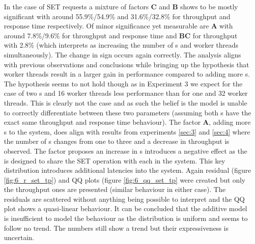     In the case of SET requests a mixture of factors \textbf{C} and \textbf{B} shows to be mostly significant with
    around 55.9\%/54.9\% and 31.6\%/32.8\% for throughput and response time respectively. Of minor significance yet
    measurable are \textbf{A} with around 7.8\%/9.6\% for throughput and response time and \textbf{BC} for
    throughput with 2.8\% (which interprets as increasing the number of \mw{}s and worker threads simultaneously).
    The change in sign occurs again correctly. The analysis aligns with previous observations and conclusions while
    bringing up the hypothesis that worker threads result in a larger gain in performance compared to adding more
    \mw{}s. The hypothesis seems to not hold though as in Experiment 3 we expect for the case of two \mw{}s and 16
    worker threads less performance than for one \mw{} and 32 worker threads. This is clearly not the case and as
    such the belief is the model is unable to correctly differentiate between these two parameters (assuming both
    \mw{}s have the exact same throughput and response time behaviour). The factor \textbf{A}, adding more \srv{}s to
    the system, does align with results from experiments \ref{sec:3} and \ref{sec:4} where the number of \srv{}s changes
    from one to three and a decrease in throughput is observed. The factor proposes an increase in \srv{}s introduces a
    negative effect as the \mw{} is designed to share the SET operation with each \srv{} in the system. This key
    distribution introduces additional latencies into the system. Again residual (figure \ref{fig:6_r_set_tp}) and QQ
    plots (figure \ref{fig:6_qq_set_tp} were created but only the throughput ones are presented (similar behaviour in
    either case). The residuals are scattered without anything being possible to interpret and the QQ plot shows a
    quasi-linear behaviour. It can be concluded that the additive model is insufficient to model the behaviour as the
    distribution is uniform and seems to follow no trend. The numbers still show a trend but their expressiveness is
    uncertain.

